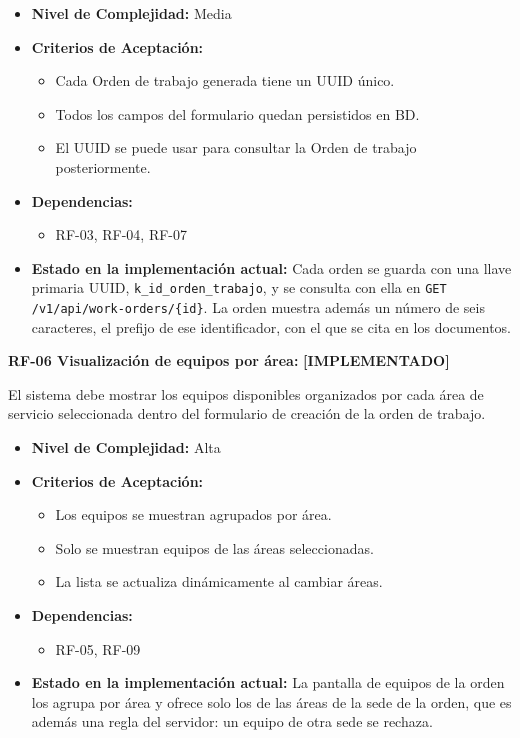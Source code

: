 \documentclass[12pt,a4paper]{article}
\newcommand{\ruta}[1]{\nolinkurl{#1}}
\newcommand{\estadoImplementado}{\textcolor{mainRed}{\textbf{[IMPLEMENTADO]}}}
\begin{document}
\begin{itemize}
  \item \textbf{Nivel de Complejidad:} Media

  \item \textbf{Criterios de Aceptación:}
  \begin{itemize}
    \item Cada Orden de trabajo generada tiene un UUID único.
    \item Todos los campos del formulario quedan persistidos en BD.
    \item El UUID se puede usar para consultar la Orden de trabajo posteriormente.
  \end{itemize}

  \item \textbf{Dependencias:}
  \begin{itemize}
    \item RF-03, RF-04, RF-07
  \end{itemize}

  \item \textbf{Estado en la implementación actual:} Cada orden se guarda con una llave primaria UUID, \texttt{k\_id\_orden\_trabajo}, y se consulta con ella en \texttt{GET} \ruta{/v1/api/work-orders/{id}}. La orden muestra además un número de seis caracteres, el prefijo de ese identificador, con el que se cita en los documentos.
\end{itemize}

\textbf{RF-06 Visualización de equipos por área:} \estadoImplementado{}

El sistema debe mostrar los equipos disponibles organizados por cada área de servicio seleccionada dentro del formulario de creación de la orden de trabajo.

\begin{itemize}
  \item \textbf{Nivel de Complejidad:} Alta

  \item \textbf{Criterios de Aceptación:}
  \begin{itemize}
    \item Los equipos se muestran agrupados por área.
    \item Solo se muestran equipos de las áreas seleccionadas.
    \item La lista se actualiza dinámicamente al cambiar áreas.
  \end{itemize}

  \item \textbf{Dependencias:}
  \begin{itemize}
    \item RF-05, RF-09
  \end{itemize}

  \item \textbf{Estado en la implementación actual:} La pantalla de equipos de la orden los agrupa por área y ofrece solo los de las áreas de la sede de la orden, que es además una regla del servidor: un equipo de otra sede se rechaza.
\end{itemize}
\end{document}
